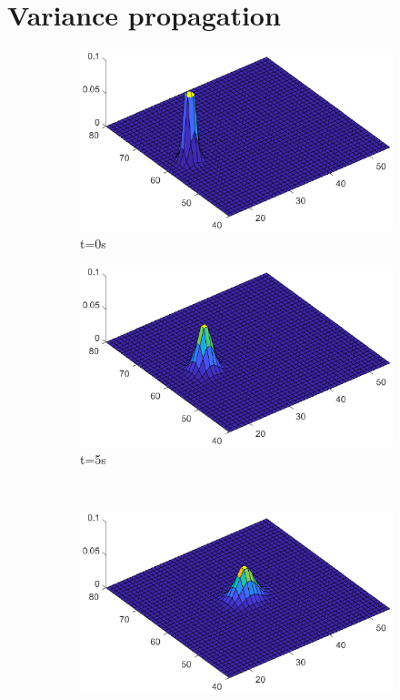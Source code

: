 \section{Variance propagation}

\begin{figure}[t]
    \centering
    \begin{subfigure}{.5\textwidth}
        \centering
        \includegraphics[width=\linewidth]{Figures/PDF_t0}
        \caption{t=0s}
        \label{fig:PDF_initial}
    \end{subfigure}%
    \begin{subfigure}{0.5\textwidth}
        \centering
        \includegraphics[width = \linewidth]{Figures/PDF_t5}
        \caption{t=5s}
        \label{fig:PDF_t5}
    \end{subfigure} \\
    \begin{subfigure}{.5\textwidth}
        \centering
    \includegraphics[width=\linewidth]{Figures/PDF_t15}

\end{subfigure}
\end{figure}
